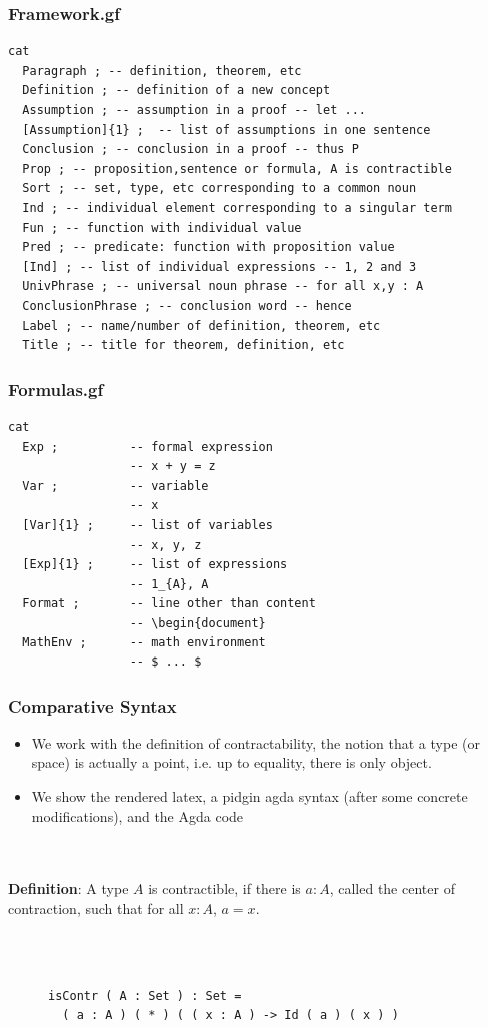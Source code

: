 \documentclass[10pt]{beamer}
\newcommand{\equalH}[2]{#1 = #2}
\begin{document}
\begin{frame}[fragile]
\frametitle{Framework.gf}
\begin{verbatim}
cat
  Paragraph ; -- definition, theorem, etc
  Definition ; -- definition of a new concept
  Assumption ; -- assumption in a proof -- let ...
  [Assumption]{1} ;  -- list of assumptions in one sentence
  Conclusion ; -- conclusion in a proof -- thus P
  Prop ; -- proposition,sentence or formula, A is contractible
  Sort ; -- set, type, etc corresponding to a common noun
  Ind ; -- individual element corresponding to a singular term
  Fun ; -- function with individual value
  Pred ; -- predicate: function with proposition value
  [Ind] ; -- list of individual expressions -- 1, 2 and 3
  UnivPhrase ; -- universal noun phrase -- for all x,y : A
  ConclusionPhrase ; -- conclusion word -- hence
  Label ; -- name/number of definition, theorem, etc
  Title ; -- title for theorem, definition, etc
\end{verbatim}
\end{frame}
\begin{frame}[fragile]

\frametitle{Formulas.gf}
\begin{verbatim}
cat
  Exp ;          -- formal expression             
                 -- x + y = z
  Var ;          -- variable
                 -- x
  [Var]{1} ;     -- list of variables             
                 -- x, y, z
  [Exp]{1} ;     -- list of expressions           
                 -- 1_{A}, A
  Format ;       -- line other than content       
                 -- \begin{document}
  MathEnv ;      -- math environment              
                 -- $ ... $
\end{verbatim}
\end{frame}

\begin{frame}[fragile]
\frametitle{Comparative Syntax}

\begin{itemize}
\item We work with the definition of contractability, the notion that a type (or space) is
actually a point, i.e. up to equality, there is only object. 
\item We show the rendered latex, a pidgin agda syntax (after some concrete
  modifications), and the Agda code
\end{itemize}\\~\\

\textbf{Definition}:
A type $A$ is contractible, if there is $a : A$, called the center of contraction, such that for all $x : A$, $\equalH {a}{x}$.

\\~\\
\begin{figure}
\begin{verbatim}
isContr ( A : Set ) : Set = 
  ( a : A ) ( * ) ( ( x : A ) -> Id ( a ) ( x ) )
\end{verbatim}
\end{figure}

% 

\end{frame}
\end{document}
